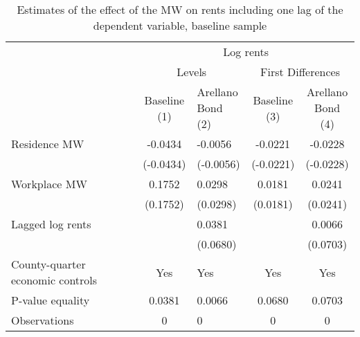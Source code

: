 \begin{table}[hbt!]
    \centering
    \caption{Estimates of the effect of the MW on rents including one lag of the 
             dependent variable, baseline sample}
    \label{tab:arellano_bond}

    \begin{tabular}{@{}lclcc@{}}
        \toprule
                                             & \multicolumn{4}{c}{Log rents}                                                       \\ \cmidrule(l){2-5} 
                                             & \multicolumn{2}{c}{Levels}               & \multicolumn{2}{c}{First Differences}    \\ \cmidrule(l){2-5} 
        \multicolumn{1}{c}{}                 & \shortstack{Baseline\\(1)} 
                                             & \shortstack{Arellano\\Bond (2)} 
                                             & \shortstack{Baseline\\(3)} 
                                             & \shortstack{Arellano\\Bond (4)}                                                     \\ \midrule
        Residence MW                         & -0.0434                  & -0.0056               & -0.0221                  & -0.0228               \\
                                             & (-0.0434)                & (-0.0056)             & (-0.0221)                & (-0.0228)             \\
        Workplace MW                         & 0.1752                  & 0.0298               & 0.0181                  & 0.0241               \\
                                             & (0.1752)                & (0.0298)             & (0.0181)                & (0.0241)             \\
        Lagged log rents                     &                      & 0.0381               &                      & 0.0066               \\
                                             &                      & (0.0680)             &                      & (0.0703)             \\ \midrule
        County-quarter economic controls     & Yes                  & Yes               & Yes                  & Yes               \\
        P-value equality                     & 0.0381                  & 0.0066               & 0.0680                  & 0.0703               \\
        Observations                         & 0                 & 0              & 0                 & 0              \\ \bottomrule


\end{tabular}
\end{table}
